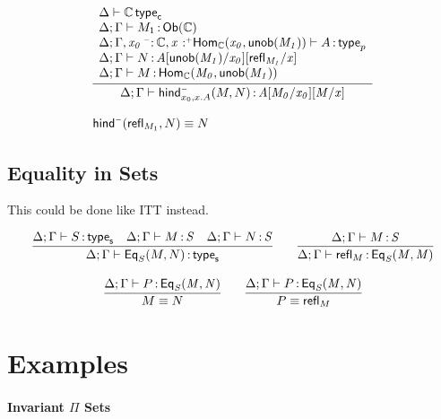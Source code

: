 \documentclass[11pt]{article}
\theoremstyle{plain}
\begin{document}
\[
\begin{array}{l}
\infer{\oftpsf{\Delta}{\Gamma}{\morindcon{x_0,x.A}{M}{N}}{\subst{\subst{A}{M_0}{x_0}}{M}{x}}}
      { \begin{array}{l}
          \wftpcc{\Delta}{\C} \\
          \oftpp{\Delta}{\Gamma}{M_1}{\obtp \C} \\
          \wftpp{\Delta}{\Gamma,\vptptm{x_0}{\con}{\C},\vstptm{x}{\co}{\Hom{\C}{x_0}{\unob{M_1}}}}{A} \\
          \oftpp{\Delta}{\Gamma}{N}{\subst{\subst{A}{\unob{M_1}}{x_0}}{\refl{M_1}}{x}} \\
          \oftpsf{\Delta}{\Gamma}{M}{\Hom{\C}{M_0}{\unob{M_1}}} \\
        \end{array}
      }
\\ \\
\morindcon{}{\refl{M_1}}{N} \deq N
\end{array}
\]

\subsection{Equality in Sets}

This could be done like ITT instead.  

\[
\begin{array}{c}
\infer{\wftpsf{\Delta}{\Gamma}{\Eq{S}{M}{N}}}
      {\wftpsf{\Delta}{\Gamma}{S} &
        \oftpsf{\Delta}{\Gamma}{M}{S} & 
        \oftpsf{\Delta}{\Gamma}{N}{S} 
      }
\qquad
\infer{\oftpsf{\Delta}{\Gamma}{\refl{M}}{\Eq{S}{M}{M}}}
      {\oftpsf{\Delta}{\Gamma}{M}{S}}
\\ \\
\infer{M \deq N}
      {\oftpsf{\Delta}{\Gamma}{P}{\Eq{S}{M}{N}}}
\qquad
\infer{P \deq \refl{M}}
      {\oftpsf{\Delta}{\Gamma}{P}{\Eq{S}{M}{N}}}
\end{array}
\]

\section{Examples}

\paragraph{Invariant $\Pi$ Sets}

\newcommand\piinv[3]{\ensuremath{\textnormal{$\Pi$}^{\dsd{inv}}\,\tptmns{#1}{#2}.\,\dcd{#3}}}
\end{document}
